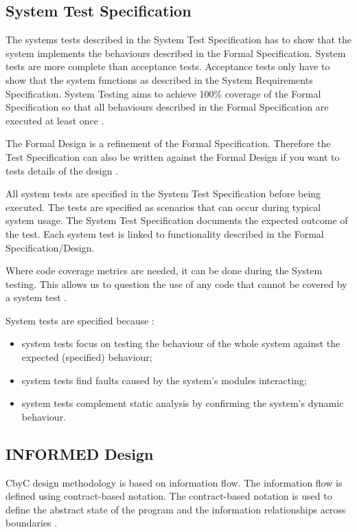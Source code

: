 \subsection{System Test Specification}

The systems tests described in the System Test Specification has to show that the system implements the 
behaviours described in the Formal Specification. System tests are more complete than 
acceptance tests. Acceptance tests only have to show that the system functions as described in the 
System Requirements Specification. System Testing aims to achieve 100\% coverage of the Formal 
Specification so that all behaviours described in the Formal Specification are executed at least once \parencite{Tokeneer}.

The Formal Design is a refinement of the Formal Specification. Therefore the Test
Specification can also be written against the Formal Design if you want to tests 
details of the design \parencite{Tokeneer}.

All system tests are specified in the System Test Specification before being executed.
The tests are specified as scenarios that can occur during typical system usage. 
The System Test Specification documents the expected outcome of the test. 
Each system test is linked to functionality described in the Formal Specification/Design\parencite{Tokeneer}.

Where code coverage metrics are needed, it can be done during the System testing. 
This allows us to question the use of any code that cannot be covered
by a system test \parencite{Tokeneer}.

System tests are specified because \parencite{Tokeneer}:
\begin{itemize}
	\item system tests focus on testing the behaviour of the whole system against
		the expected (specified) behaviour;
	\item system tests find faults caused by the system's modules interacting;
	\item system tests complement static analysis by confirming the system's dynamic behaviour.
\end{itemize}

\subsection{INFORMED Design}
CbyC design methodology is based on information flow. The information flow is 
defined using contract-based notation. The contract-based notation is used to
define the abstract state of the program and the information relationships across
boundaries \parencite{CbyCMan}.

